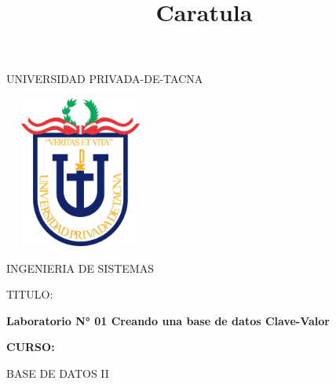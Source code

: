 \documentclass[12pt,letterpaper]{article}
\begin{document}
%


\title{Caratula}

\begin{titlepage}
\begin{center}
\large{UNIVERSIDAD PRIVADA-DE-TACNA}\\
\vspace*{-0.025in}
\begin{figure}[htb]
\begin{center}

\end{center}
\end{figure}
\begin{center}
    \includegraphics[width=5cm, height=5cm]{img/upt.jpg}  
\end{center}

\vspace*{0.15in}
INGENIERIA DE SISTEMAS  \\

\vspace*{0.5in}
\begin{large}
TITULO:\\
\end{large}

\vspace*{0.1in}
\begin{Large}
\textbf{Laboratorio N° 01 Creando una base de datos Clave-Valor} \\
\end{Large}

\vspace*{0.3in}
\begin{Large}
\textbf{CURSO:} \\
\end{Large}

\vspace*{0.1in}
\begin{large}
BASE DE DATOS II\\
\end{large}


\end{center}
\end{titlepage}
\end{document}
